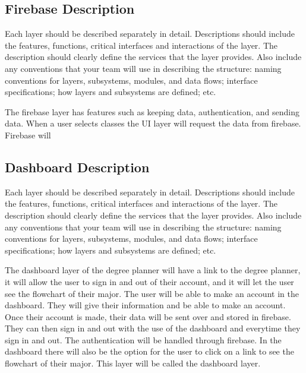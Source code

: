     

    

\subsection{Firebase Description}
Each layer should be described separately in detail. Descriptions should include the features, functions, critical interfaces and interactions of the layer. The description should clearly define the services that the layer provides. Also include any conventions that your team will use in describing the structure: naming conventions for layers, subsystems, modules, and data flows; interface specifications; how layers and subsystems are defined; etc.

    The firebase layer has features such as keeping data, authentication, and sending data. When a user selects classes the UI layer will request the data from firebase. Firebase will

\subsection{Dashboard Description}
Each layer should be described separately in detail. Descriptions should include the features, functions, critical interfaces and interactions of the layer. The description should clearly define the services that the layer provides. Also include any conventions that your team will use in describing the structure: naming conventions for layers, subsystems, modules, and data flows; interface specifications; how layers and subsystems are defined; etc. 

    The dashboard layer of the degree planner will have a link to the degree planner, it will allow the user to sign in and out of their account, and it will let the user see the flowchart of their major. The user will be able to make an account in the dashboard. They will give their information and be able to make an account. Once their account is made, their data will be sent over and stored in firebase. They can then sign in and out with the use of the dashboard and everytime they sign in and out. The authentication will be handled through firebase. In the dashboard there will also be the option for the user to click on a link to see the flowchart of their major. This layer will be called the dashboard layer. 
